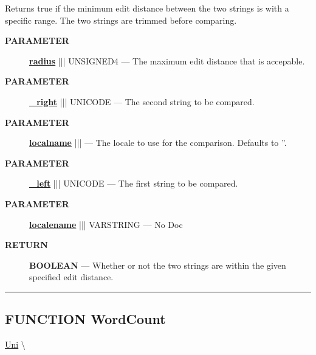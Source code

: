 \par





Returns true if the minimum edit distance between the two strings is with a specific range. The two strings are trimmed before comparing.






\par
\begin{description}
\item [\colorbox{tagtype}{\color{white} \textbf{\textsf{PARAMETER}}}] \textbf{\underline{radius}} ||| UNSIGNED4 --- The maximum edit distance that is accepable.
\item [\colorbox{tagtype}{\color{white} \textbf{\textsf{PARAMETER}}}] \textbf{\underline{\_right}} ||| UNICODE --- The second string to be compared.
\item [\colorbox{tagtype}{\color{white} \textbf{\textsf{PARAMETER}}}] \textbf{\underline{localname}} |||  --- The locale to use for the comparison. Defaults to ''.
\item [\colorbox{tagtype}{\color{white} \textbf{\textsf{PARAMETER}}}] \textbf{\underline{\_left}} ||| UNICODE --- The first string to be compared.
\item [\colorbox{tagtype}{\color{white} \textbf{\textsf{PARAMETER}}}] \textbf{\underline{localename}} ||| VARSTRING --- No Doc
\end{description}







\par
\begin{description}
\item [\colorbox{tagtype}{\color{white} \textbf{\textsf{RETURN}}}] \textbf{BOOLEAN} --- Whether or not the two strings are within the given specified edit distance.
\end{description}




\rule{\linewidth}{0.5pt}
\subsection*{\textsf{\colorbox{headtoc}{\color{white} FUNCTION}
WordCount}}

\hypertarget{ecldoc:uni.wordcount}{}
\hspace{0pt} \hyperlink{ecldoc:Uni}{Uni} \textbackslash 

